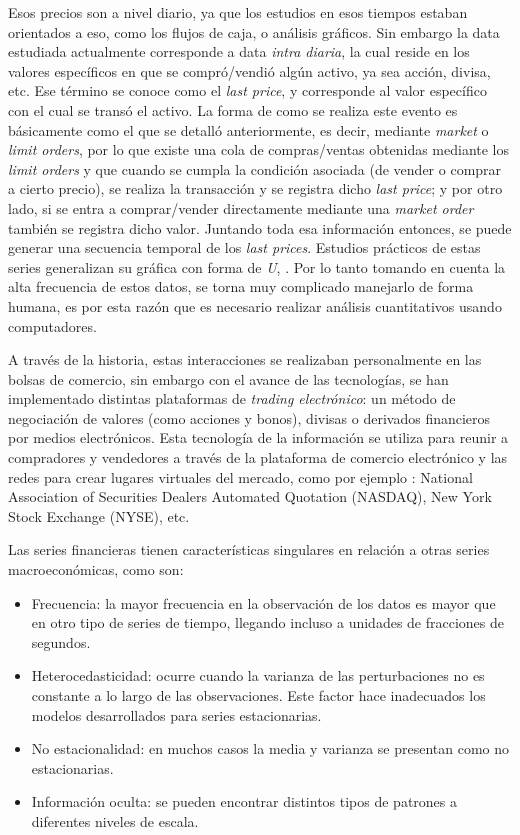 Esos precios son a nivel diario, ya que los estudios en esos tiempos estaban orientados a eso, como los flujos de caja, o análisis gráficos.
Sin embargo la data estudiada actualmente corresponde a data \emph{intra diaria}, la cual reside en los valores
específicos en que se compró/vendió algún activo, ya sea acción, divisa, etc. Ese término se conoce como el \emph{last price}, y corresponde
al valor específico con el cual se transó el activo. La forma de como se realiza este evento es básicamente como el que se detalló anteriormente,
es decir, mediante \emph{market} o \emph{limit orders}, por lo que existe una cola de compras/ventas obtenidas mediante los \emph{limit orders} y que cuando
se cumpla la condición asociada (de vender o comprar a cierto precio), se realiza la transacción y se registra dicho \emph{last price}; 
y por otro lado, si se entra a comprar/vender directamente mediante una \emph{market order} también se registra dicho valor. Juntando toda esa información 
entonces, se puede generar una secuencia temporal de los \emph{last prices}. Estudios prácticos de estas series generalizan su gráfica con forma de \emph{U},
\cite{biais2012empirical}. Por lo tanto tomando en cuenta la alta frecuencia de estos datos, se torna muy complicado manejarlo de forma humana, es por esta 
razón que es necesario realizar análisis cuantitativos usando computadores.

A través de la historia, estas interacciones se realizaban personalmente en las bolsas de comercio, sin embargo con el avance de las tecnologías,
se han implementado distintas plataformas de \emph{trading electrónico}: un método de negociación de valores (como acciones y bonos), divisas o derivados 
financieros por medios electrónicos. Esta tecnología de la información se utiliza para reunir a compradores y vendedores a través de la plataforma de 
comercio electrónico y las redes para crear lugares virtuales del mercado, como por ejemplo \cite{weston2002electronic}: National Association of Securities Dealers Automated 
Quotation (NASDAQ), New York Stock Exchange (NYSE), etc. 

Las series financieras tienen características singulares en relación a otras series macroeconómicas, como son: 
\begin{itemize}
	\item Frecuencia: la mayor frecuencia en la observación de los datos es mayor que en otro tipo de series de tiempo, llegando incluso
		a unidades de fracciones de segundos.
	\item Heterocedasticidad: ocurre cuando la varianza de las perturbaciones no es constante a lo largo de las observaciones.
		Este factor hace inadecuados los modelos desarrollados para series estacionarias.
	\item No estacionalidad: en muchos casos la media y varianza se presentan como no estacionarias.
	\item Información oculta: se pueden encontrar distintos tipos de patrones a diferentes niveles de escala.
\end{itemize}

